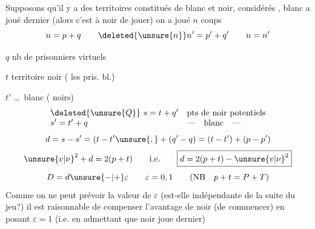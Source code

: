 Supposons qu'il y a des territoires
constitués de blanc et noir, considérés
, blanc a joué dernier
(alors c'est à noir de jouer) on a
joué $n$ coups
\[
n=p+q\qquad\deleted{\unsure{n}}n'=p'+q'\qquad n=n'
\]

$q$ nb de prisonniers virtuels

$t$ territoire noir ( les pris. bl.)

$t'$ \ldots\ blanc (\text{---} noirs)
\[
\begin{array}{ll}
\deleted{\unsure{Q}}\ s=t+q'&\text{pts de noir potentiels}\\
s'=t'+q&\text{---}\quad\text{blanc}\quad\text{---}
\end{array}
\]
\[
d=s-s'=(t-t'\unsure{,}+(q'-q)=(t-t')+(p-p')
\]
\[
\unsure{v|\nu}^2+d=2(p+t)\qquad\text{i.e.}\qquad\boxed{d=2(p+t)-\unsure{v|\nu}^2}
\]
\[
D=d\unsure{-|+}\varepsilon\qquad\varepsilon=0,1\qquad(\mathrm{NB}\quad p+t=P+T)
\]
Comme on ne peut prévoir la valeur de
$\varepsilon$ (est-elle indépendante de la suite du
jeu?) il est raisonnable de compenser
l'avantage de noir (de commencer)
en posant $\varepsilon=1$ (i.e. en admettant que
noir joue dernier)
